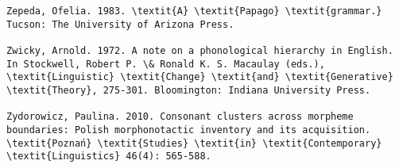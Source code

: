 \begin{verbatim}
Zepeda, Ofelia. 1983. \textit{A} \textit{Papago} \textit{grammar.} Tucson: The University of Arizona Press.

Zwicky, Arnold. 1972. A note on a phonological hierarchy in English. In Stockwell, Robert P. \& Ronald K. S. Macaulay (eds.), \textit{Linguistic} \textit{Change} \textit{and} \textit{Generative} \textit{Theory}, 275-301. Bloomington: Indiana University Press.

Zydorowicz, Paulina. 2010. Consonant clusters across morpheme boundaries: Polish morphonotactic inventory and its acquisition. \textit{Poznań} \textit{Studies} \textit{in} \textit{Contemporary} \textit{Linguistics} 46(4): 565-588.

 
\end{verbatim}
